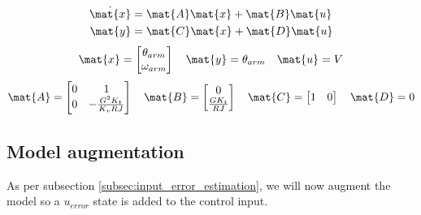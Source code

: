 \begin{theorem}
  \begin{align*}
    \dot{\mat{x}} &= \mat{A} \mat{x} + \mat{B} \mat{u} \\
    \mat{y} &= \mat{C} \mat{x} + \mat{D} \mat{u}
  \end{align*}
  \begin{equation*}
    \mat{x} =
    \begin{bmatrix}
      \theta_{arm} \\
      \omega_{arm}
    \end{bmatrix}
    \quad
    \mat{y} = \theta_{arm}
    \quad
    \mat{u} = V
  \end{equation*}
  \begin{equation}
    \mat{A} =
    \begin{bmatrix}
      0 & 1 \\
      0 & -\frac{G^2 K_t}{K_v RJ}
    \end{bmatrix}
    \quad
    \mat{B} =
    \begin{bmatrix}
      0 \\
      \frac{G K_t}{RJ}
    \end{bmatrix}
    \quad
    \mat{C} =
    \begin{bmatrix}
      1 & 0
    \end{bmatrix}
    \quad
    \mat{D} = 0
  \end{equation}
\end{theorem}

\subsection{Model augmentation}

As per subsection \ref{subsec:input_error_estimation}, we will now augment the
\gls{model} so a $u_{error}$ state is added to the \gls{control input}.

